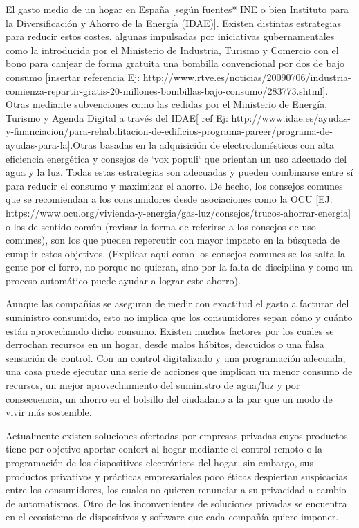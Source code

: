 El gasto medio de un hogar en España [según fuentes* INE o bien Instituto para la Diversificación y Ahorro de la Energía (IDAE)]. Existen distintas estrategias para reducir estos costes, algunas impulsadas por iniciativas gubernamentales como la introducida por el Ministerio de Industria, Turismo y Comercio con el bono para canjear de forma gratuita una bombilla convencional por dos de bajo consumo [insertar referencia Ej: http://www.rtve.es/noticias/20090706/industria-comienza-repartir-gratis-20-millones-bombillas-bajo-consumo/283773.shtml]. Otras mediante subvenciones como las cedidas por el Ministerio de Energía, Turismo y Agenda Digital a través del IDAE[ ref Ej: http://www.idae.es/ayudas-y-financiacion/para-rehabilitacion-de-edificios-programa-pareer/programa-de-ayudas-para-la].Otras basadas en la adquisición de electrodomésticos con alta eficiencia energética y consejos de `vox populi` que orientan un uso adecuado del agua y la luz. Todas estas estrategias son adecuadas y pueden combinarse entre sí para reducir el consumo y maximizar el ahorro. De hecho, los consejos comunes que se recomiendan a los consumidores desde asociaciones como la OCU [EJ: https://www.ocu.org/vivienda-y-energia/gas-luz/consejos/trucos-ahorrar-energia] o los de sentido común (revisar la forma de referirse a los consejos de uso comunes), son los que pueden repercutir con mayor impacto en la búsqueda de cumplir estos objetivos. (Explicar aqui como los consejos comunes se los salta la gente por el forro, no porque no quieran, sino por la falta de disciplina y como un proceso automático puede ayudar a lograr este ahorro).

Aunque las compañías se aseguran de medir con exactitud el gasto a facturar del suministro consumido, esto no implica que los consumidores sepan cómo y cuánto están aprovechando dicho consumo. Existen muchos factores por los cuales se derrochan recursos en un hogar, desde malos hábitos, descuidos o una falsa sensación de control. Con un control digitalizado y una programación adecuada, una casa puede ejecutar una serie de acciones que implican un menor consumo de recursos, un mejor aprovechamiento del suministro de agua/luz y por consecuencia, un ahorro en el bolsillo del ciudadano a la par que un modo de vivir más sostenible.

Actualmente existen soluciones ofertadas por empresas privadas cuyos productos tiene por objetivo aportar confort al hogar mediante el control remoto o la programación de los dispositivos electrónicos del hogar, sin embargo, sus productos privativos y prácticas empresariales poco éticas despiertan suspicacias entre los consumidores, los cuales no quieren renunciar a su privacidad a cambio de automatismos. Otro de los inconvenientes de soluciones privadas se encuentra en el ecosistema de dispositivos y software que cada compañía quiere imponer.



